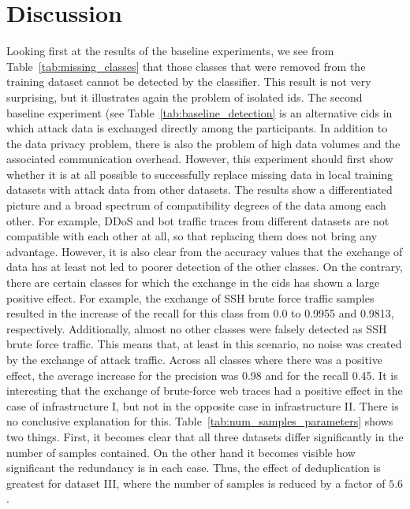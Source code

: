 \documentclass[../../main.tex]{subfiles}
\begin{document}
\section{Discussion}

Looking first at the results of the baseline experiments, we see from Table~\ref{tab:missing_classes} that those classes that were removed from the training dataset cannot be detected by the classifier. This result is not very surprising, but it illustrates again the problem of isolated \gls{ids}. The second baseline experiment (see Table~\ref{tab:baseline_detection} is an alternative \gls{cids} in which attack data is exchanged directly among the participants. In addition to the data privacy problem, there is also the problem of high data volumes and the associated communication overhead. However, this experiment should first show whether it is at all possible to successfully replace missing data in local training datasets with attack data from other datasets. The results show a differentiated picture and a broad spectrum of compatibility degrees of the data among each other. For example, DDoS and bot traffic traces from different datasets are not compatible with each other at all, so that replacing them does not bring any advantage. However, it is also clear from the accuracy values that the exchange of data has at least not led to poorer detection of the other classes. On the contrary, there are certain classes for which the exchange in the \gls{cids} has shown a large positive effect. For example, the exchange of SSH brute force traffic samples resulted in the increase of the recall for this class from 0.0 to 0.9955 and 0.9813, respectively. Additionally, almost no other classes were falsely detected as SSH brute force traffic. This means that, at least in this scenario, no noise was created by the exchange of attack traffic. Across all classes where there was a positive effect, the average increase for the precision was 0.98 and for the recall 0.45. It is interesting that the exchange of brute-force web traces had a positive effect in the case of infrastructure I, but not in the opposite case in infrastructure II. There is no conclusive explanation for this. Table~\ref{tab:num_samples_parameters} shows two things. First, it becomes clear that all three datasets differ significantly in the number of samples contained. On the other hand it becomes visible how significant the redundancy is in each case. Thus, the effect of deduplication is greatest for dataset III, where the number of samples is reduced by a factor of $5.6$.
\end{document}
